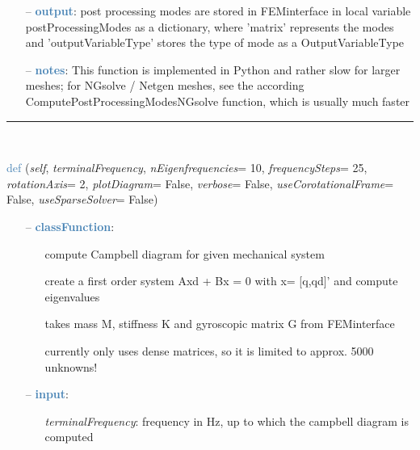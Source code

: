 \begin{itemize}[leftmargin=1.4cm]
\begin{itemize}[leftmargin=1.4cm]
\begin{itemize}[leftmargin=1.4cm]
\begin{itemize}[leftmargin=0.5cm]
\begin{itemize}[leftmargin=1.4cm]
\begin{itemize}[leftmargin=1.4cm]
\begin{itemize}[leftmargin=0.5cm]
\begin{itemize}[leftmargin=0.7cm]
\begin{itemize}[leftmargin=1.2cm]
\end{itemize}
\item[--]\textcolor{steelblue}{\bf output}: post processing modes are stored in FEMinterface in local variable postProcessingModes as a dictionary, where 'matrix' represents the modes and 'outputVariableType' stores the type of mode as a OutputVariableType
\item[--]\textcolor{steelblue}{\bf notes}: This function is implemented in Python and rather slow for larger meshes; for NGsolve / Netgen meshes, see the according ComputePostProcessingModesNGsolve function, which is usually much faster
\vspace{12pt}\end{itemize}
%
\noindent\rule{8cm}{0.75pt}\vspace{1pt} \\ 
\begin{flushleft}
\noindent \textcolor{steelblue}{def {\bf {}}}\label{sec:FEM:FEMinterface:ComputeCampbellDiagram}
({\it self}, {\it terminalFrequency}, {\it nEigenfrequencies}= 10, {\it frequencySteps}= 25, {\it rotationAxis}= 2, {\it plotDiagram}= False, {\it verbose}= False, {\it useCorotationalFrame}= False, {\it useSparseSolver}= False)
\end{flushleft}
\setlength{\itemindent}{0.7cm}
\begin{itemize}[leftmargin=0.7cm]
\item[--]\textcolor{steelblue}{\bf classFunction}: \vspace{-6pt}
\begin{itemize}[leftmargin=1.2cm]
\setlength{\itemindent}{-0.7cm}
\item[]compute Campbell diagram for given mechanical system
\item[]create a first order system Axd + Bx = 0 with x= [q,qd]' and compute eigenvalues
\item[]takes mass M, stiffness K and gyroscopic matrix G from FEMinterface
\item[]currently only uses dense matrices, so it is limited to approx. 5000 unknowns!
\end{itemize}
\item[--]\textcolor{steelblue}{\bf input}: \vspace{-6pt}
\begin{itemize}[leftmargin=1.2cm]
\setlength{\itemindent}{-0.7cm}
\item[]{\it terminalFrequency}: frequency in Hz, up to which the campbell diagram is computed

\end{itemize}
\end{itemize}
\end{itemize}
\end{itemize}
\end{itemize}
\end{itemize}
\end{itemize}
\end{itemize}
\end{itemize}
